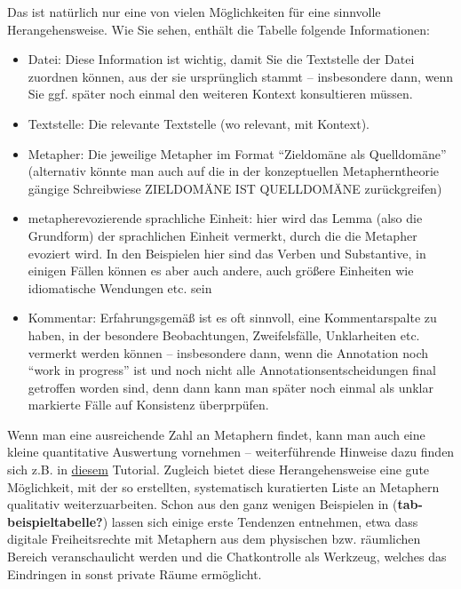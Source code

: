 \documentclass[
  letterpaper,
  DIV=11,
  numbers=noendperiod]{scrreprt}
\begin{document}
Das ist natürlich nur eine von vielen Möglichkeiten für eine sinnvolle
Herangehensweise. Wie Sie sehen, enthält die Tabelle folgende
Informationen:

\begin{itemize}
\item
  Datei: Diese Information ist wichtig, damit Sie die Textstelle der
  Datei zuordnen können, aus der sie ursprünglich stammt -- insbesondere
  dann, wenn Sie ggf. später noch einmal den weiteren Kontext
  konsultieren müssen.
\item
  Textstelle: Die relevante Textstelle (wo relevant, mit Kontext).
\item
  Metapher: Die jeweilige Metapher im Format ``Zieldomäne als
  Quelldomäne'' (alternativ könnte man auch auf die in der konzeptuellen
  Metapherntheorie gängige Schreibwiese ZIELDOMÄNE IST QUELLDOMÄNE
  zurückgreifen)
\item
  metapherevozierende sprachliche Einheit: hier wird das Lemma (also die
  Grundform) der sprachlichen Einheit vermerkt, durch die die Metapher
  evoziert wird. In den Beispielen hier sind das Verben und Substantive,
  in einigen Fällen können es aber auch andere, auch größere Einheiten
  wie idiomatische Wendungen etc. sein
\item
  Kommentar: Erfahrungsgemäß ist es oft sinnvoll, eine Kommentarspalte
  zu haben, in der besondere Beobachtungen, Zweifelsfälle, Unklarheiten
  etc. vermerkt werden können -- insbesondere dann, wenn die Annotation
  noch ``work in progress'' ist und noch nicht alle
  Annotationsentscheidungen final getroffen worden sind, denn dann kann
  man später noch einmal als unklar markierte Fälle auf Konsistenz
  überprpüfen.
\end{itemize}

Wenn man eine ausreichende Zahl an Metaphern findet, kann man auch eine
kleine quantitative Auswertung vornehmen -- weiterführende Hinweise dazu
finden sich z.B. in
\href{https://empirical-linguistics.github.io/ems/datenaufbereitung/index.html}{diesem}
Tutorial. Zugleich bietet diese Herangehensweise eine gute Möglichkeit,
mit der so erstellten, systematisch kuratierten Liste an Metaphern
qualitativ weiterzuarbeiten. Schon aus den ganz wenigen Beispielen in
(\textbf{tab-beispieltabelle?}) lassen sich einige erste Tendenzen
entnehmen, etwa dass digitale Freiheitsrechte mit Metaphern aus dem
physischen bzw. räumlichen Bereich veranschaulicht werden und die
Chatkontrolle als Werkzeug, welches das Eindringen in sonst private
Räume ermöglicht.
\end{document}
